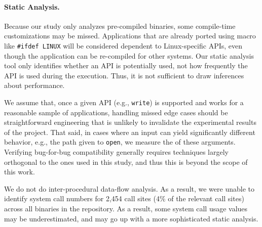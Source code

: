 
\paragraph{Static Analysis.}
Because our study only analyzes pre-compiled binaries, some compile-time customizations may be missed.
Applications that are already ported using macro like {\tt \#ifdef LINUX} will be considered dependent to Linux-specific APIs,
even though the application can be re-compiled for other systems.
Our static analysis tool only identifies 
whether an API is potentially used,
not how frequently the API is used during the execution.
Thus, it is not sufficient to draw inferences about performance.



We assume that, once a given API (e.g., {\tt write}) is supported and works for a reasonable sample of applications,
handling missed edge cases should be straightforward engineering that is unlikely to invalidate the experimental results of the project.
That said, in cases where an input can yield significantly different behavior, e.g.,
the path given to {\tt open},
we measure the \usagemetric{} of these arguments.
Verifying bug-for-bug compatibility generally requires techniques largely orthogonal to the ones used in this study,
and thus this is beyond the scope of this work.

We do not do inter-procedural data-flow analysis.  As a result,
we were unable to identify system call numbers for 2,454 call sites (4\% of the
relevant call sites)
across all binaries in the repository.  As a result,
some system call usage values may be underestimated, and may go up 
with a more sophisticated static analysis.




